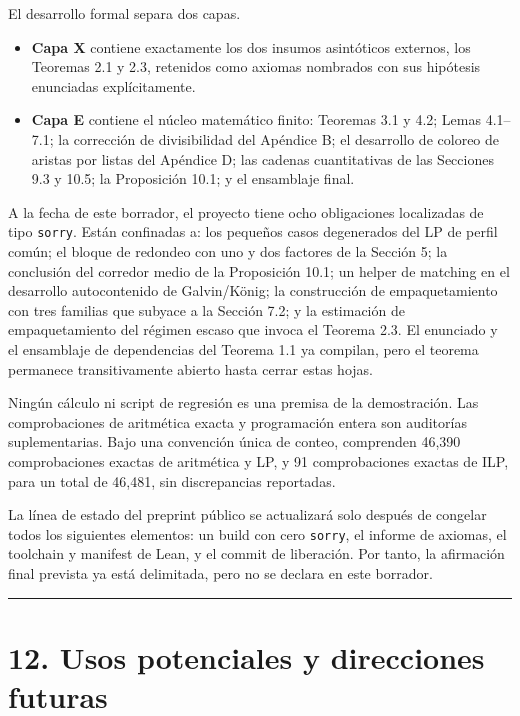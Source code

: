 \documentclass[
  11pt,
]{article}
\providecommand{\tightlist}{%
  \setlength{\itemsep}{0pt}\setlength{\parskip}{0pt}}
\begin{document}
El desarrollo formal separa dos capas.

\begin{itemize}
\tightlist
\item
  \textbf{Capa X} contiene exactamente los dos insumos asintóticos
  externos, los Teoremas 2.1 y 2.3, retenidos como axiomas nombrados con
  sus hipótesis enunciadas explícitamente.
\item
  \textbf{Capa E} contiene el núcleo matemático finito: Teoremas 3.1 y
  4.2; Lemas 4.1--7.1; la corrección de divisibilidad del Apéndice B; el
  desarrollo de coloreo de aristas por listas del Apéndice D; las
  cadenas cuantitativas de las Secciones 9.3 y 10.5; la Proposición
  10.1; y el ensamblaje final.
\end{itemize}

A la fecha de este borrador, el proyecto tiene ocho obligaciones
localizadas de tipo \texttt{sorry}. Están confinadas a: los pequeños
casos degenerados del LP de perfil común; el bloque de redondeo con uno
y dos factores de la Sección 5; la conclusión del corredor medio de la
Proposición 10.1; un helper de matching en el desarrollo autocontenido
de Galvin/König; la construcción de empaquetamiento con tres familias
que subyace a la Sección 7.2; y la estimación de empaquetamiento del
régimen escaso que invoca el Teorema 2.3. El enunciado y el ensamblaje
de dependencias del Teorema 1.1 ya compilan, pero el teorema permanece
transitivamente abierto hasta cerrar estas hojas.

Ningún cálculo ni script de regresión es una premisa de la demostración.
Las comprobaciones de aritmética exacta y programación entera son
auditorías suplementarias. Bajo una convención única de conteo,
comprenden 46,390 comprobaciones exactas de aritmética y LP, y 91
comprobaciones exactas de ILP, para un total de 46,481, sin
discrepancias reportadas.

La línea de estado del preprint público se actualizará solo después de
congelar todos los siguientes elementos: un build con cero
\texttt{sorry}, el informe de axiomas, el toolchain y manifest de Lean,
y el commit de liberación. Por tanto, la afirmación final prevista ya
está delimitada, pero no se declara en este borrador.

\begin{center}\rule{0.5\linewidth}{0.5pt}\end{center}

\section{12. Usos potenciales y direcciones
futuras}\label{usos-potenciales-y-direcciones-futuras}
\end{document}
